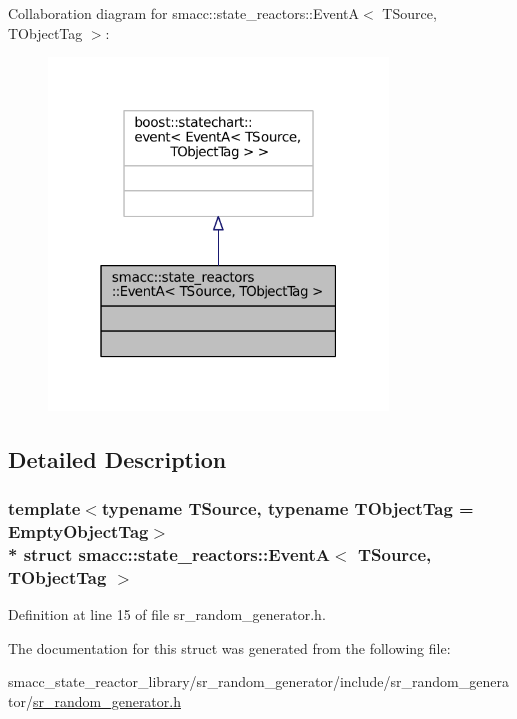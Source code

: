 Collaboration diagram for smacc\+:\+:state\+\_\+reactors\+:\+:EventA$<$ T\+Source, T\+Object\+Tag $>$\+:
\nopagebreak
\begin{figure}[H]
\begin{center}
\leavevmode
\includegraphics[width=256pt]{structsmacc_1_1state__reactors_1_1EventA__coll__graph}
\end{center}
\end{figure}


\subsection{Detailed Description}
\subsubsection*{template$<$typename T\+Source, typename T\+Object\+Tag = Empty\+Object\+Tag$>$\\*
struct smacc\+::state\+\_\+reactors\+::\+Event\+A$<$ T\+Source, T\+Object\+Tag $>$}



Definition at line 15 of file sr\+\_\+random\+\_\+generator.\+h.



The documentation for this struct was generated from the following file\+:\begin{DoxyCompactItemize}
\item 
smacc\+\_\+state\+\_\+reactor\+\_\+library/sr\+\_\+random\+\_\+generator/include/sr\+\_\+random\+\_\+generator/\hyperlink{sr__random__generator_8h}{sr\+\_\+random\+\_\+generator.\+h}\end{DoxyCompactItemize}
